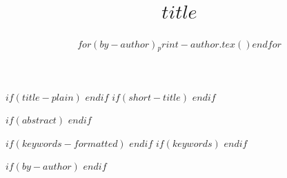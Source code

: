 \usepackage[top=.75in, bottom=.75in, left=.75in, right=.75in, footskip=0.25in]{geometry}
\author{$for(by-author)$$_print-author.tex()$$endfor$}

\title{$title$}
$if(title-plain)$
$endif$
$if(short-title)$
$endif$

$if(abstract)$
$endif$

$if(keywords-formatted)$
$endif$
$if(keywords)$
$endif$


$if(by-author)$
$endif$
